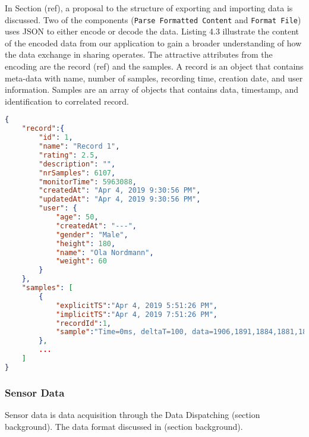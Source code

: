 In Section (ref), a proposal to the structure of exporting and importing data is discussed. Two of the components (\verb|Parse Formatted Content| and \verb|Format File|) uses JSON to either encode or decode the data. Listing 4.3 illustrate the content of the encoded data from our application to gain a broader understanding of how the data exchange in sharing operates. The attractive attributes from the encoding are the record (ref) and the samples.  A record is an object that contains meta-data with name, number of samples, recording time, creation date, and user information. Samples are an array of objects that contains data, timestamp, and identification to correlated record. 

\begin{lstlisting}[language=json, caption={My Caption}, captionpos=b]
{
    "record":{  
        "id": 1,
        "name": "Record 1",
        "rating": 2.5,
        "description": "",
        "nrSamples": 6107,
        "monitorTime": 5963088,
        "createdAt": "Apr 4, 2019 9:30:56 PM",
        "updatedAt": "Apr 4, 2019 9:30:56 PM",
        "user": {  
            "age": 50,
            "createdAt": "---",
            "gender": "Male",
            "height": 180,
            "name": "Ola Nordmann",
            "weight": 60
        }
    },
    "samples": [  
        {  
            "explicitTS":"Apr 4, 2019 5:51:26 PM",
            "implicitTS":"Apr 4, 2019 7:51:26 PM",
            "recordId":1,
            "sample":"Time=0ms, deltaT=100, data=1906,1891,1884,1881,1876,1718,1690"
        },
        ...
    ]
}
\end{lstlisting}

\subsubsection{Sensor Data}
Sensor data is data acquisition through the Data Dispatching (section background). The data format discussed in (section background). 